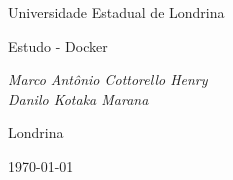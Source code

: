 \begin{titlepage}
  \centering
  \vspace*{2cm}
  {\Large Universidade Estadual de Londrina \par}
  \vspace{3cm}
  {\Huge Estudo - Docker \par}
  \vspace{2cm}
  {\Large\itshape Marco Antônio Cottorello Henry \\ Danilo Kotaka Marana \par}
  \vfill
  {\large Londrina \par}
  {\Large \today \par}
\end{titlepage}
